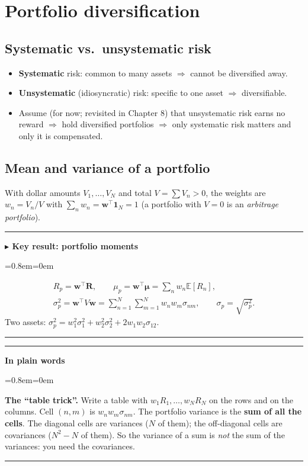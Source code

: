 \documentclass[11pt,a4paper]{report}
\newenvironment{notebox}[1]
  {\par\medskip\Needspace{6\baselineskip}\noindent\rule{\linewidth}{0.4pt}\par\nopagebreak
   \noindent\textbf{#1}\par\nopagebreak
   \begin{list}{}{\leftmargin=0.8em\rightmargin=0em\topsep=2pt}\item[]}
  {\end{list}\nopagebreak\noindent\rule{\linewidth}{0.4pt}\par\medskip}
\newenvironment{keybox}[1][]{\begin{notebox}{$\blacktriangleright$ Key result#1}}{\end{notebox}}
\newenvironment{plainbox}{\begin{notebox}{In plain words}}{\end{notebox}}
\newcommand{\E}{\mathbb{E}}
\newcommand{\one}{\mathbf{1}_N}
\newcommand{\w}{\bm{w}}
\newcommand{\R}{\bm{R}}
\newcommand{\T}{^{\top}}
\newcommand{\mub}{\bm{\mu}}
\begin{document}
\section{Portfolio diversification}

\subsection{Systematic vs.\ unsystematic risk}
\begin{itemize}
  \item \textbf{Systematic} risk: common to many assets $\Rightarrow$ cannot be diversified away.
  \item \textbf{Unsystematic} (idiosyncratic) risk: specific to one asset $\Rightarrow$ diversifiable.
  \item Assume (for now; revisited in Chapter 8) that unsystematic risk earns no
    reward $\Rightarrow$ hold diversified portfolios $\Rightarrow$ only
    systematic risk matters and only it is compensated.
\end{itemize}

\subsection{Mean and variance of a portfolio}
With dollar amounts $V_1,\dots,V_N$ and total $V=\sum V_n>0$, the weights are
$w_n=V_n/V$ with $\sum_n w_n=\w\T\one=1$ (a portfolio with $V=0$ is an
\emph{arbitrage portfolio}).
\begin{keybox}[: portfolio moments]
\begin{gather*}
R_p=\w\T\R,\qquad
\mu_p=\w\T\mub=\sum_n w_n\E[R_n],\\
\sigma_p^2=\w\T V\w=\sum_{n=1}^N\sum_{m=1}^N w_nw_m\sigma_{nm},\qquad
\sigma_p=\sqrt{\sigma_p^2}.
\end{gather*}
Two assets: $\sigma_p^2=w_1^2\sigma_1^2+w_2^2\sigma_2^2+2w_1w_2\sigma_{12}$.
\end{keybox}

\begin{plainbox}
\textbf{The ``table trick''.} Write a table with $w_1R_1,\dots,w_NR_N$ on the
rows and on the columns. Cell $(n,m)$ is $w_nw_m\sigma_{nm}$. The portfolio
variance is the \textbf{sum of all the cells}. The diagonal cells are variances
($N$ of them); the off-diagonal cells are covariances ($N^2-N$ of them). So the
variance of a sum is \emph{not} the sum of the variances: you need the covariances.
\end{plainbox}
\end{document}
